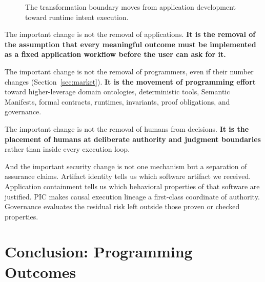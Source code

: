 \documentclass[10pt,oneside,openany]{book}
\begin{document}
\begin{figure}[ht]
\centering
{}
\caption{The transformation boundary moves from application development toward runtime intent execution.}
\end{figure}

The important change is not the removal of applications. \textbf{It is the removal of the assumption that every meaningful outcome must be implemented as a fixed application workflow before the user can ask for it.}

The important change is not the removal of programmers, even if their number changes (Section~\ref{sec:market}). \textbf{It is the movement of programming effort} toward higher-leverage domain ontologies, deterministic tools, Semantic Manifests, formal contracts, runtimes, invariants, proof obligations, and governance.

The important change is not the removal of humans from decisions. \textbf{It is the placement of humans at deliberate authority and judgment boundaries} rather than inside every execution loop.

And the important security change is not one mechanism but a separation of assurance claims. Artifact identity tells us which software artifact we received. Application containment tells us which behavioral properties of that software are justified. PIC makes causal execution lineage a first-class coordinate of authority. Governance evaluates the residual risk left outside those proven or checked properties.

\chapter{Conclusion: Programming Outcomes}
\end{document}
